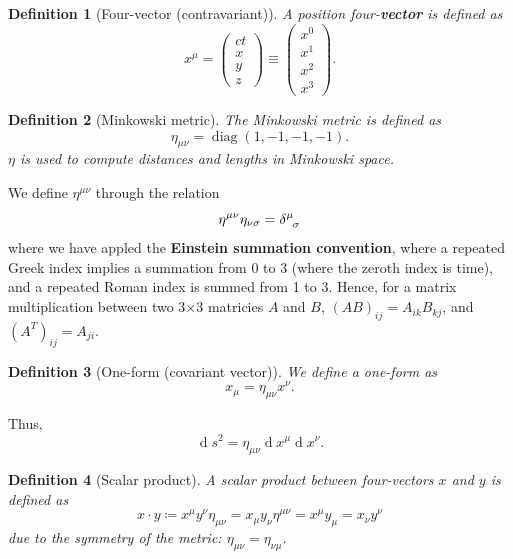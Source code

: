 \documentclass[11pt]{article}
\numberwithin{equation}{section}
\newcommand{\defeq}{\coloneqq}
\renewcommand{\d}[1]{\ensuremath{\operatorname{d}\!{#1}}}
\DeclareMathOperator{\diag}{diag}
\newtheorem{defn}{Definition}[section]
\begin{document}
\begin{defn}[Four-vector (contravariant)]
A position four-\textbf{vector} is defined as
\begin{equation}
x^\mu = \begin{pmatrix}ct\\x\\y\\z\end{pmatrix} \equiv \begin{pmatrix}x^0\\x^1\\x^2\\x^3\end{pmatrix}.
\end{equation}
\end{defn}
\begin{defn}[Minkowski metric]
The Minkowski metric is defined as 
\begin{equation}
\eta_{\mu \nu} = \diag(1,-1,-1,-1).
\end{equation}
$\eta$ is used to compute distances and lengths in Minkowski space.
\end{defn}
\noindent We define $\eta^{\mu \nu}$ through the relation
\begin{equation}
\eta^{\mu \nu} \eta_{\nu \sigma} = \tensor{\delta}{^\mu_\sigma}
\end{equation}
where we have appled the \textbf{Einstein summation convention}, where a repeated Greek index implies a summation from 0 to 3 (where the zeroth index is time), and a repeated Roman index is summed from 1 to 3. Hence, for a matrix multiplication between two 3$\times$3 matricies $A$ and $B$, $(AB)_{ij} = A_{ik}B_{kj}$, and $(A^T)_{ij}=A_{ji}$.


\begin{defn}[One-form (covariant vector)]
We define a one-form as 
\begin{equation}
x_\mu = \eta_{\mu \nu}x^\nu.
\end{equation}
\end{defn} 
\noindent Thus,
\begin{equation}
\d s^2 = \eta_{\mu \nu} \d x^\mu \d x^\nu.
\end{equation}
\begin{defn}[Scalar product]
A scalar product between four-vectors $x$ and $y$ is defined as
\begin{equation}
x \cdot y \defeq x^\mu y^\nu \eta_{\mu \nu} = x_\mu y_\nu \eta^{\mu \nu} = x^\mu y_\mu = x_\nu y^\nu
\end{equation}
due to the symmetry of the metric: $\eta_{\mu \nu} = \eta_{\nu \mu}$.
\end{defn}
\end{document}
